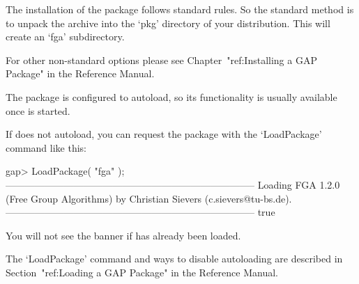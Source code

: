

\null

The installation of the {\FGA} package follows standard {\GAP} rules.
So the standard method is to unpack the archive into the `pkg'
directory  of your {\GAP} distribution.  This will create an `fga'
subdirectory. 

For other non-standard options please see Chapter~"ref:Installing a
GAP Package" in the {\GAP} Reference Manual.


\null

The {\FGA} package is configured to autoload, so its functionality is
usually available once {\GAP} is started.

If {\GAP} does not autoload, you can request the package with the
`LoadPackage' command like this:

\testexamplefalse
\beginexample
gap> LoadPackage( "fga" );
-----------------------------------------------------------------------------
Loading  FGA 1.2.0 (Free Group Algorithms)
by Christian Sievers (c.sievers@tu-bs.de).
-----------------------------------------------------------------------------
true
\endexample

You will not see the banner if {\FGA} has already been loaded.

The `LoadPackage' command and ways to disable autoloading are
described in Section~"ref:Loading a GAP Package" in the {\GAP}
Reference Manual.

